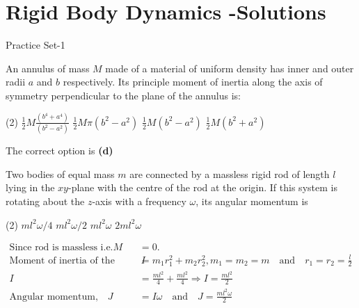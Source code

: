 \chapter{Rigid Body Dynamics -Solutions}
\begin{abox}
	Practice Set-1 
	\end{abox}
\begin{enumerate}
\begin{minipage}{\textwidth}
\item An annulus of mass $M$ made of a material of uniform density has inner and outer radii $a$ and $b$ respectively. Its principle moment of inertia along the axis of symmetry perpendicular to the plane of the annulus is:
\end{minipage}
\begin{tasks}(2)
	\task[\textbf{A.}] $\frac{1}{2} M \frac{\left(b^{4}+a^{4}\right)}{\left(b^{2}-a^{2}\right)}$
	\task[\textbf{B.}]$\frac{1}{2} M \pi\left(b^{2}-a^{2}\right)$
	\task[\textbf{C.}]$\frac{1}{2} M\left(b^{2}-a^{2}\right)$
	\task[\textbf{D.}]$\frac{1}{2} M\left(b^{2}+a^{2}\right)$
\end{tasks}
\begin{answer}
	The correct option is \textbf{(d)}
\end{answer}
\begin{minipage}{\textwidth}
	\item Two bodies of equal mass $m$ are connected by a massless rigid rod of length $l$ lying in the $x y$-plane with the centre of the rod at the origin. If this system is rotating about the $z$-axis with a frequency $\omega$, its angular momentum is
\end{minipage}
\begin{tasks}(2)
	\task[\textbf{A.}] $m l^{2} \omega / 4$
	\task[\textbf{B.}]$m l^{2} \omega / 2$
	\task[\textbf{C.}]$m l^{2} \omega$
	\task[\textbf{D.}]$2 m l^{2} \omega$
\end{tasks}
\begin{answer}
 \begin{align*}
 \text{Since rod is massless i.e}. M&=0.\\
 \text{Moment of inertia of the system} \quad I&=m_{1} r_{1}^{2}+m_{2} r_{2}^{2}, m_{1}=m_{2}=m \quad \text{and} \quad r_{1}=r_{2}=\frac{l}{2}\\
 I&=\frac{m l^{2}}{4}+\frac{m l^{2}}{4} \Rightarrow I=\frac{m l^{2}}{2}\\
 \text{Angular momentum,} \quad J&=I \omega \quad \text{and} \quad J=\frac{m l^{2} \omega}{2}

\end{align*}
\end{answer}
\end{enumerate}
